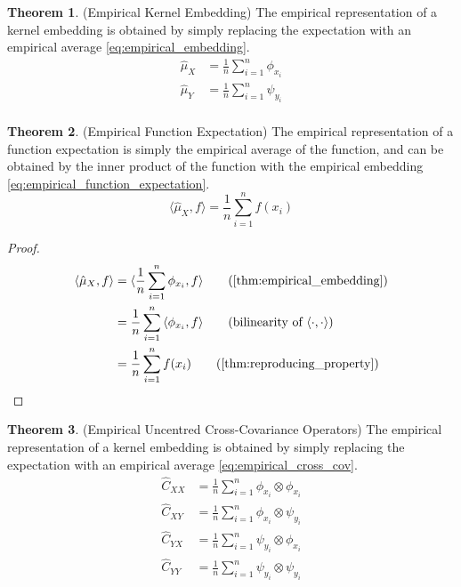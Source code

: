 \documentclass[twoside]{article} \usepackage{aistats2017}
\theoremstyle{definition}
\newtheorem{theorem}{Theorem}[section]
\newcommand{\rv}[1]{{#1}}
\newcommand{\inner}[2]{{\langle #1, #2 \rangle}}
\newcommand{\hatmuX}{\hat{\mu}_{\rv{X}}}
\newcommand{\hatmuY}{\hat{\mu}_{\rv{Y}}}
\newcommand{\hatCxy}{\hat{C}_{\rv{X} \rv{Y}}}
\newcommand{\hatCyx}{\hat{C}_{\rv{Y} \rv{X}}}
\newcommand{\hatCxx}{\hat{C}_{\rv{X} \rv{X}}}
\newcommand{\hatCyy}{\hat{C}_{\rv{Y} \rv{Y}}}
\begin{document}
		\begin{theorem} \label{thm:empirical_embedding}
			(Empirical Kernel Embedding)
			The empirical representation of a kernel embedding is obtained by simply replacing the expectation with an empirical average \eqref{eq:empirical_embedding}.
			\begin{equation}
			\begin{aligned}
				\hatmuX &= \frac{1}{n} \sum_{i = 1}^{n} \phi_{x_{i}} \\
				\hatmuY &= \frac{1}{n} \sum_{i = 1}^{n} \psi_{y_{i}} \\
			\label{eq:empirical_embedding}
			\end{aligned}
			\end{equation}
		\end{theorem}
	
		\begin{theorem} \label{thm:empirical_function_expectation}
			(Empirical Function Expectation)
			The empirical representation of a function expectation is simply the empirical average of the function, and can be obtained by the inner product of the function with the empirical embedding \eqref{eq:empirical_function_expectation}.
			\begin{equation}
				\inner{\hatmuX}{f} = \frac{1}{n} \sum_{i = 1}^{n} f(x_{i})
				\label{eq:empirical_function_expectation}
			\end{equation}
			
			\begin{proof}
				\begin{align*}
					\inner{\hatmuX}{f} &= \inner{\frac{1}{n} \sum_{i = 1}^{n} \phi_{x_{i}}}{f} \tag{\cref{thm:empirical_embedding}} \\
					&= \frac{1}{n} \sum_{i = 1}^{n} \inner{\phi_{x_{i}}}{f} \tag{bilinearity of $\inner{\cdot}{\cdot}$} \\
					&= \frac{1}{n} \sum_{i = 1}^{n} f(x_{i}) \tag{\cref{thm:reproducing_property}}
				\end{align*}
			\end{proof}
		\end{theorem}
		
		\begin{theorem} \label{thm:empirical_cross_cov}
			(Empirical Uncentred Cross-Covariance Operators)
			The empirical representation of a kernel embedding is obtained by simply replacing the expectation with an empirical average \eqref{eq:empirical_cross_cov}.
			\begin{equation}
			\begin{aligned}
				\hatCxx &= \frac{1}{n} \sum_{i = 1}^{n} \phi_{x_{i}} \otimes \phi_{x_{i}} \\
				\hatCxy &= \frac{1}{n} \sum_{i = 1}^{n} \phi_{x_{i}} \otimes \psi_{y_{i}} \\
				\hatCyx &= \frac{1}{n} \sum_{i = 1}^{n} \psi_{y_{i}} \otimes \phi_{x_{i}} \\
				\hatCyy &= \frac{1}{n} \sum_{i = 1}^{n} \psi_{y_{i}} \otimes \psi_{y_{i}} \\
			\label{eq:empirical_cross_cov}
			\end{aligned}
			\end{equation}
		\end{theorem}
		
\end{document}
